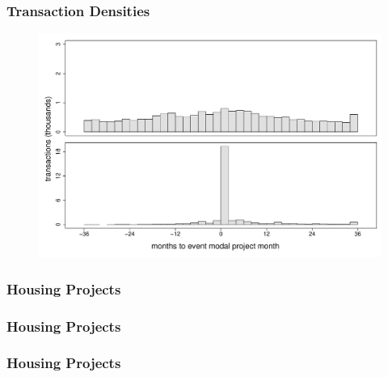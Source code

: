 \documentclass[aspectratio=149]{beamer}
\begin{document}

\begin{frame}
\frametitle{Transaction Densities}
\begin{center}
\begin{figure}
\includegraphics[scale=0.32]{summary_densitytime.pdf}
\vspace{-3mm}
\end{figure}
\end{center}
\end{frame}



\begin{frame}
\frametitle{Housing Projects}
\vspace{-1.5mm}
\begin{table}
{\footnotesize

}
\end{table}
\end{frame}


\begin{frame}
\frametitle{Housing Projects}
\vspace{-1.5mm}
\begin{table}
{\footnotesize

}
\end{table}
\end{frame}


\begin{frame}
\frametitle{Housing Projects}
\vspace{-1.5mm}
\begin{table}
{\footnotesize

}
\end{table}
\end{frame}
\end{document}
